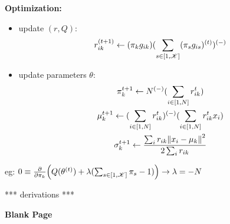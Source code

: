 \begin{frame} [t] {\bf Optimization:} 
    \begin{itemize}
        \item update $(r,Q)$:
\begin{gather*}
        r _{ik} ^{(t+1)}
    \leftarrow 
    (\pi _{k} g_{ik})
    (\sum _{s \in [1, \mathscr {K}]} (\pi _{s} g_{is})
      ^{(t)} ) ^{(-)}
\end{gather*}
        \item update parameters $\theta$:
\begin{gather*}
    \pi _{k} ^{t+1} 
\leftarrow 
    N ^{(-)} 
    (\sum _{i\in [1, N]} r _{ik} ^{t})
\\
    \mu _{k} ^{t+1} 
\leftarrow 
    (\sum _{i\in [1, N]} r _{ik} ^{t})^{(-)} 
    (\sum _{i\in [1, N]} r _{ik} ^{t} x_{i}) 
\\
    \sigma _{k} ^{t+1} 
\leftarrow 
     \frac 
     { 
       \sum _{i}
       r _{i k}
      \norm 
       { x _{i} - \mu _{k}} 
         ^{2}
     }
     { 2 \sum _{i}
       r _{i k}
     }
\end{gather*}  
    \end{itemize}
\alert {eg:} 
    $
    0
\equiv
    \pdv {\pi _{k}}
    \qty 
    (
    Q (\theta ^{(t)})    
+
    \lambda 
    ( \sum _{s \in [1, \mathscr {K}]} 
      \pi _{s} 
    -  1 )
    )
\rightarrow 
    \lambda = - N
    $  
    
*** derivations ***

\end{frame} 


\begin{frame} 
      {\bf Blank Page}
\end{frame} 


